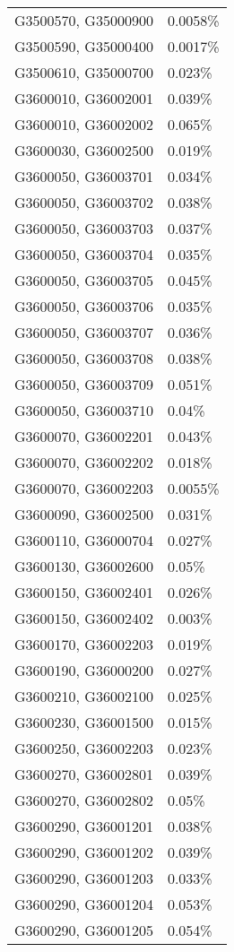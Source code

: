 \begin{longtable}[]{@{}ll@{}}
G3500570, G35000900 & 0.0058\% \\
G3500590, G35000400 & 0.0017\% \\
G3500610, G35000700 & 0.023\% \\
G3600010, G36002001 & 0.039\% \\
G3600010, G36002002 & 0.065\% \\
G3600030, G36002500 & 0.019\% \\
G3600050, G36003701 & 0.034\% \\
G3600050, G36003702 & 0.038\% \\
G3600050, G36003703 & 0.037\% \\
G3600050, G36003704 & 0.035\% \\
G3600050, G36003705 & 0.045\% \\
G3600050, G36003706 & 0.035\% \\
G3600050, G36003707 & 0.036\% \\
G3600050, G36003708 & 0.038\% \\
G3600050, G36003709 & 0.051\% \\
G3600050, G36003710 & 0.04\% \\
G3600070, G36002201 & 0.043\% \\
G3600070, G36002202 & 0.018\% \\
G3600070, G36002203 & 0.0055\% \\
G3600090, G36002500 & 0.031\% \\
G3600110, G36000704 & 0.027\% \\
G3600130, G36002600 & 0.05\% \\
G3600150, G36002401 & 0.026\% \\
G3600150, G36002402 & 0.003\% \\
G3600170, G36002203 & 0.019\% \\
G3600190, G36000200 & 0.027\% \\
G3600210, G36002100 & 0.025\% \\
G3600230, G36001500 & 0.015\% \\
G3600250, G36002203 & 0.023\% \\
G3600270, G36002801 & 0.039\% \\
G3600270, G36002802 & 0.05\% \\
G3600290, G36001201 & 0.038\% \\
G3600290, G36001202 & 0.039\% \\
G3600290, G36001203 & 0.033\% \\
G3600290, G36001204 & 0.053\% \\
G3600290, G36001205 & 0.054\% \\

\end{longtable}
